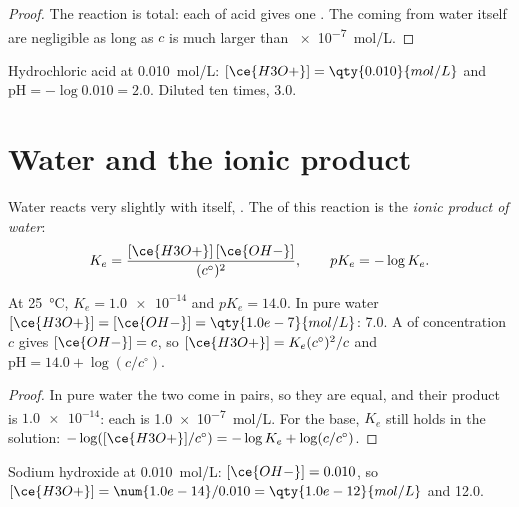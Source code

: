 \begin{proof}
The reaction  is total: each  of acid
gives one . The  coming from water itself are negligible
as long as $c$ is much larger than \qty{e-7}{mol/L}.
\end{proof}

\begin{example}\label{ex:g12:ka-and-pka:hcl}
Hydrochloric acid at \qty{0.010}{mol/L}: $[\ce{H3O+}] = \qty{0.010}{mol/L}$
and $\mathrm{pH} = -\log 0.010 = 2.0$. Diluted ten times,  3.0.
\end{example}

\section{Water and the ionic product}


\begin{definition}\label{def:g12:ka-and-pka:ionic-product}
Water reacts very slightly with itself, . The
 of this reaction is the \emph{ionic product of
water}:
\[
  K_e = \frac{[\ce{H3O+}]\,[\ce{OH-}]}{(c^\circ)^2},
  \qquad pK_e = -\log K_e .
\]
\end{definition}

\begin{proposition}\label{prop:g12:ka-and-pka:ke}
At \qty{25}{\celsius}, $K_e = \num{1.0e-14}$ and $pK_e = 14.0$. In pure
water $[\ce{H3O+}] = [\ce{OH-}] = \qty{1.0e-7}{mol/L}$:  7.0. A  of concentration $c$ gives $[\ce{OH-}] = c$, so
$[\ce{H3O+}] = K_e (c^\circ)^2 / c$ and $\mathrm{pH} = 14.0 + \log(c/c^\circ)$.
\end{proposition}

\begin{proof}
In pure water the two  come in pairs, so they are equal, and their
product is $\num{1.0e-14}$: each is \qty{1.0e-7}{mol/L}. For the base,
$K_e$ still holds in the solution:
$-\log([\ce{H3O+}]/c^\circ) = -\log K_e + \log(c/c^\circ)$.
\end{proof}

\begin{example}\label{ex:g12:ka-and-pka:naoh}
Sodium hydroxide at \qty{0.010}{mol/L}: $[\ce{OH-}] = 0.010$, so
$[\ce{H3O+}] = \num{1.0e-14}/0.010 = \qty{1.0e-12}{mol/L}$ and  12.0.
\end{example}

